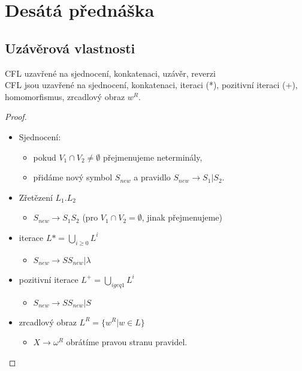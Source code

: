 \documentclass[../main.tex]{subfiles}
\begin{document}
\section{Desátá přednáška}
\subsection{Uzávěrová vlastnosti}
\begin{theorem}
    CFL uzavřené na sjednocení, konkatenaci, uzávěr, reverzi\\

    CFL jsou uzavřené na sjednocení, konkatenaci, iteraci (*), pozitivní iteraci (+), homomorfismus, zrcadlový obraz $w^R$.
    \begin{proof}
        \begin{itemize}
            \item Sjednocení:
            \begin{itemize}
                \item pokud $V_1 \cap V_2 \neq \emptyset$ přejmenujeme neterminály,
                \item přidáme nový symbol $S_{new}$ a pravidlo $S_{new} \rightarrow S_1|S_2$.
            \end{itemize}
            \item Zřetězení $L_1.L_2$
            \begin{itemize}
                \item $S_{new} \rightarrow S_1S_2$ (pro $V_1 \cap V_2 = \emptyset$, jinak přejmenujeme)  
            \end{itemize}
            \item iterace $L* =\bigcup_{i\geq 0} L^i$
            \begin{itemize}
                \item $S_{new} \rightarrow SS_{new}|\lambda$
            \end{itemize}
            \item pozitivní iterace $L^+ = \bigcup_{igeq 1} L^i$
            \begin{itemize}
                \item $S_{new} \rightarrow SS_{new}|S$
            \end{itemize}
            \item zrcadlový obraz $L^R = \{w^R|w\in L\}$
            \begin{itemize}
                \item $X \rightarrow \omega^R$ obrátíme pravou stranu pravidel. 
            \end{itemize}
        \end{itemize}
    \end{proof}
\end{theorem}
\end{document}
